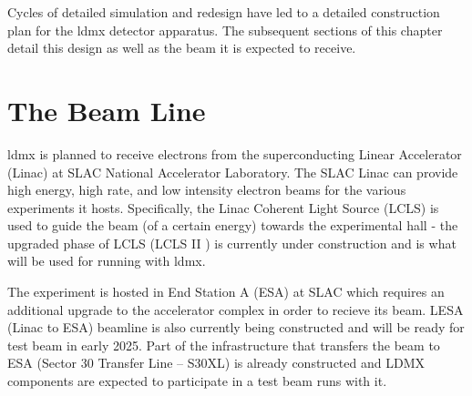 Cycles of detailed simulation and redesign have led to a detailed construction plan for the
\ac{ldmx} detector apparatus. The subsequent sections of this chapter detail this design as well as
the beam it is expected to receive.

\section{The Beam Line}
\ac{ldmx} is planned to receive electrons from the superconducting Linear Accelerator (Linac)
at SLAC National Accelerator Laboratory.
The SLAC Linac can provide high energy, high rate, and low intensity electron beams for
the various experiments it hosts.
Specifically, the Linac Coherent Light Source (LCLS) is used to guide the beam (of a certain energy)
towards the experimental hall
- the upgraded phase of LCLS (LCLS II \cite{lcls-ii}) is currently under construction and is what will
be used for running with \ac{ldmx}.

The experiment is hosted in End Station A (ESA) at SLAC which requires an additional upgrade to the
accelerator complex in order to recieve its beam. LESA (Linac to ESA) beamline \cite{lesa-design} is also
currently being constructed and will be ready for test beam in early 2025. Part of the
infrastructure that transfers the beam to ESA (Sector 30 Transfer Line -- S30XL) is already
constructed and LDMX components are expected to participate in a test beam runs with it.

